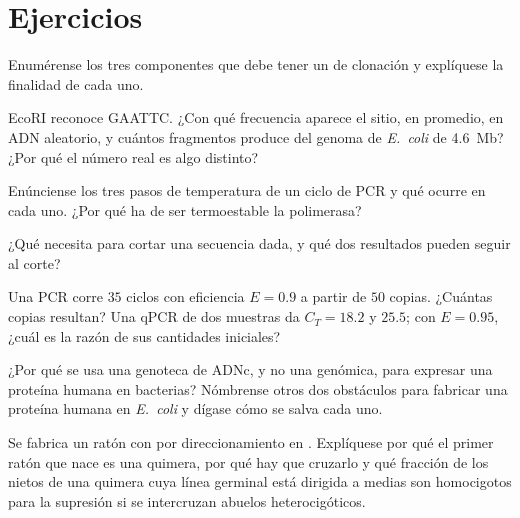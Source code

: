 \section{Ejercicios}

\begin{exercise}[$\star$]\label{exo:b3:genetic-engineering:1}
Enumérense los tres componentes que debe tener un  de clonación y
explíquese la finalidad de cada uno.
\end{exercise}

\begin{exercise}[$\star$]\label{exo:b3:genetic-engineering:2}
EcoRI reconoce GAATTC. ¿Con qué frecuencia aparece el sitio, en promedio,
en ADN aleatorio, y cuántos fragmentos produce del genoma de
\emph{E.~coli} de \qty{4.6}{Mb}? ¿Por qué el número real es algo distinto?
\end{exercise}

\begin{exercise}[$\star$]\label{exo:b3:genetic-engineering:3}
Enúnciense los tres pasos de temperatura de un ciclo de PCR y qué ocurre
en cada uno. ¿Por qué ha de ser termoestable la polimerasa?
\end{exercise}

\begin{exercise}[$\star$]\label{exo:b3:genetic-engineering:4}
¿Qué necesita  para cortar una secuencia dada, y qué dos resultados
pueden seguir al corte?
\end{exercise}

\begin{exercise}[$\star\star$]\label{exo:b3:genetic-engineering:5}
Una PCR corre $35$ ciclos con eficiencia $E = 0.9$ a partir de $50$
copias. ¿Cuántas copias resultan? Una qPCR de dos muestras da
$C_{T} = 18.2$ y $25.5$; con $E = 0.95$, ¿cuál es la razón de sus
cantidades iniciales?
\end{exercise}

\begin{exercise}[$\star\star$]\label{exo:b3:genetic-engineering:6}
¿Por qué se usa una genoteca de ADNc, y no una genómica, para expresar
una proteína humana en bacterias? Nómbrense otros dos obstáculos para
fabricar una proteína humana en \emph{E.~coli} y dígase cómo se salva
cada uno.
\end{exercise}

\begin{exercise}[$\star\star$]\label{exo:b3:genetic-engineering:7}
Se fabrica un ratón con  por direccionamiento en . Explíquese por qué el primer ratón que nace es una
quimera, por qué hay que cruzarlo y qué fracción de los nietos de una
quimera cuya línea germinal está dirigida a medias son homocigotos para
la supresión si se intercruzan abuelos heterocigóticos.
\end{exercise}


